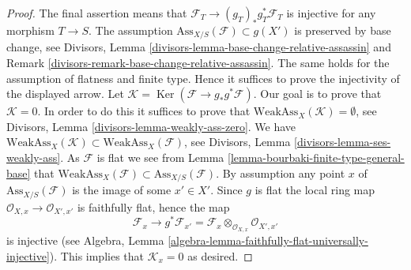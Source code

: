 \documentclass[10pt,a4paper]{amsart}
\theoremstyle{plain}
\theoremstyle{definition}
\theoremstyle{remark}
\numberwithin{equation}{subsection}
\def\Ker{\mathop{\mathrm{Ker}}}
\begin{document}
\begin{proof}
The final assertion means that $\mathcal{F}_T \to (g_T)_*g_T^*\mathcal{F}_T$
is injective for any morphism $T \to S$. The assumption
$\text{Ass}_{X/S}(\mathcal{F}) \subset g(X')$ is preserved by base change, see
Divisors, Lemma \ref{divisors-lemma-base-change-relative-assassin} and
Remark \ref{divisors-remark-base-change-relative-assassin}.
The same holds for the assumption of flatness and finite type.
Hence it suffices to prove the injectivity of the displayed arrow.
Let $\mathcal{K} = \Ker(\mathcal{F} \to g_*g^*\mathcal{F})$.
Our goal is to prove that $\mathcal{K} = 0$.
In order to do this it suffices to prove that
$\text{WeakAss}_X(\mathcal{K}) = \emptyset$, see
Divisors, Lemma \ref{divisors-lemma-weakly-ass-zero}.
We have
$\text{WeakAss}_X(\mathcal{K}) \subset \text{WeakAss}_X(\mathcal{F})$, see
Divisors, Lemma \ref{divisors-lemma-ses-weakly-ass}.
As $\mathcal{F}$ is flat we see from
Lemma \ref{lemma-bourbaki-finite-type-general-base}
that $\text{WeakAss}_X(\mathcal{F}) \subset \text{Ass}_{X/S}(\mathcal{F})$.
By assumption any point $x$ of $\text{Ass}_{X/S}(\mathcal{F})$
is the image of some $x' \in X'$. Since $g$ is flat the
local ring map $\mathcal{O}_{X, x} \to \mathcal{O}_{X', x'}$
is faithfully flat, hence the map
$$
\mathcal{F}_x
\longrightarrow
g^*\mathcal{F}_{x'} =
\mathcal{F}_x \otimes_{\mathcal{O}_{X, x}} \mathcal{O}_{X', x'}
$$
is injective (see
Algebra, Lemma \ref{algebra-lemma-faithfully-flat-universally-injective}).
This implies that $\mathcal{K}_x = 0$ as desired.
\end{proof}
\end{document}
